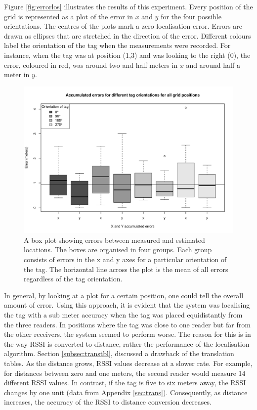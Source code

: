 Figure \ref{fig:errorlos} illustrates the results of this experiment. Every position of the grid is represented as a plot of the error in $x$ and $y$ for the four possible orientations. The centres of the plots mark a zero localisation error. Errors are drawn as ellipses that are stretched in the direction of the error. Different colours label the orientation of the tag when the measurements were recorded. For instance, when the tag was at position (1,3) and was looking to the right (0\textdegree), the error, coloured in red, was around two and half meters in $x$ and around half a meter in $y$. 
\begin{figure}[H]
	\begin{center}
		\includegraphics[width=.8\textwidth]{figures/error_boxplot}
		\caption{A box plot showing errors between measured and estimated locations. The boxes are organised in four groups. Each group consists of errors in the x and y axes for a particular orientation of the tag. The horizontal line across the plot is the mean of all errors regardless of the tag orientation.}
		\label{fig:errorlosbox}
	\end{center}
\end{figure}

In general, by looking at a plot for a certain position, one could tell the overall amount of error. Using this approach, it is evident that the system was localising the tag with a sub meter accuracy when the tag was placed equidistantly from the three readers. In positions where the tag was close to one reader but far from the other receivers, the system seemed to perform worse. The reason for this is in the way RSSI is converted to distance, rather the performance of the localisation algorithm. Section \ref{subsec:transtbl}, discussed a drawback of the translation tables. As the distance grows, RSSI values decrease at a slower rate. For example, for distances between zero and one meters, the second reader would measure 14 different RSSI values. In contrast, if the tag is five to six meters away, the RSSI changes by one unit (data from Appendix \ref{sec:trans}). Consequently, as distance increases, the accuracy of the RSSI to distance conversion decreases.

